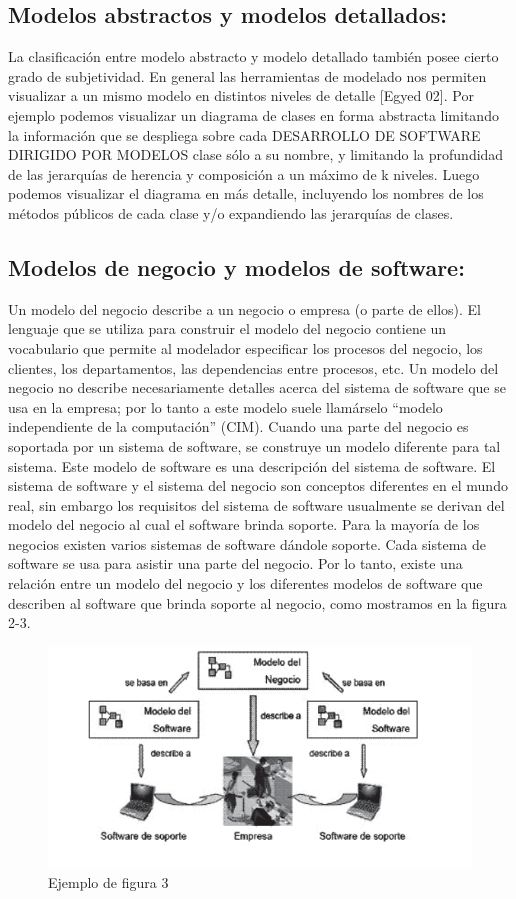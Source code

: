 \subsection{Modelos abstractos y modelos detallados:}
 La clasificación entre modelo abstracto y modelo detallado también posee cierto grado de subjetividad. En general las herramientas de modelado nos permiten visualizar a un mismo modelo en distintos niveles de detalle [Egyed 02]. Por ejemplo podemos visualizar un diagrama de clases en forma abstracta limitando la información que se despliega sobre cada DESARROLLO DE SOFTWARE DIRIGIDO POR MODELOS clase sólo a su nombre, y limitando la profundidad de las jerarquías de herencia y composición a un máximo de k niveles. Luego podemos visualizar el diagrama en más detalle, incluyendo los nombres de los métodos públicos de cada clase y/o expandiendo las jerarquías de clases.
 
\subsection{Modelos de negocio y modelos de software:}
 Un modelo del negocio describe a un negocio o empresa (o parte de ellos). El lenguaje que se utiliza para construir el modelo del negocio contiene un vocabulario que permite al modelador especificar los procesos del negocio, los clientes, los departamentos, las dependencias entre procesos, etc. Un modelo del negocio no describe necesariamente detalles acerca del sistema de software que se usa en la empresa; por lo tanto a este modelo suele llamárselo “modelo independiente de la computación” (CIM). Cuando una parte del negocio es soportada por un sistema de software, se construye un modelo diferente para tal sistema. Este modelo de software es una descripción del sistema de software. El sistema de software y el sistema del negocio son conceptos diferentes en el mundo real, sin embargo los requisitos del sistema de software usualmente se derivan del modelo del negocio al cual el software brinda soporte. Para la mayoría de los negocios existen varios sistemas de software dándole soporte. Cada sistema de software se usa para asistir una parte del negocio. Por lo tanto, existe una relación entre un modelo del negocio y los diferentes modelos de software que describen al software que brinda soporte al negocio, como mostramos en la figura 2-3.
\begin{figure}[H]
\centering
\includegraphics[scale=0.9]{./Imagenes/modelo3}
\caption{Ejemplo de figura 3}
\label{figura3}
\end{figure}

